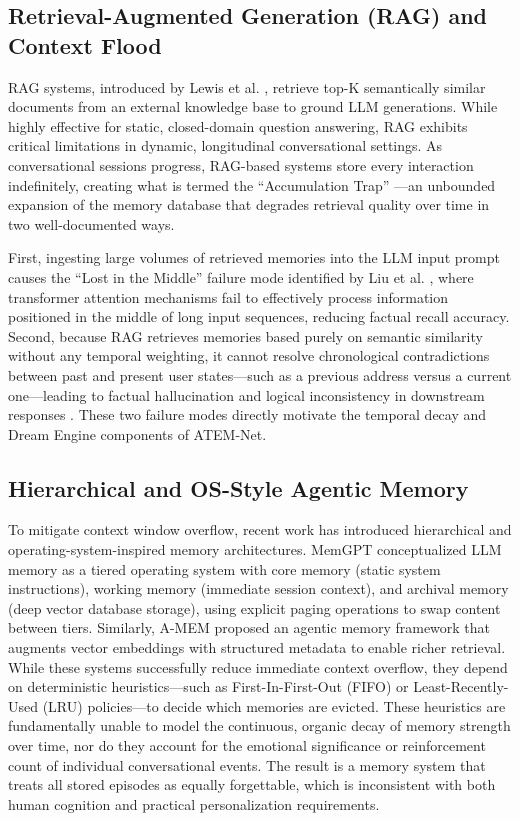 \documentclass[conference]{IEEEtran}
\begin{document}
\subsection{Retrieval-Augmented Generation (RAG) and Context Flood}

RAG systems, introduced by Lewis et al. \cite{lewis}, retrieve top-K semantically similar documents from an external knowledge base to ground LLM generations. While highly effective for static, closed-domain question answering, RAG exhibits critical limitations in dynamic, longitudinal conversational settings. As conversational sessions progress, RAG-based systems store every interaction indefinitely, creating what is termed the ``Accumulation Trap'' \cite{thompson}—an unbounded expansion of the memory database that degrades retrieval quality over time in two well-documented ways.

First, ingesting large volumes of retrieved memories into the LLM input prompt causes the ``Lost in the Middle'' failure mode identified by Liu et al. \cite{liu}, where transformer attention mechanisms fail to effectively process information positioned in the middle of long input sequences, reducing factual recall accuracy. Second, because RAG retrieves memories based purely on semantic similarity without any temporal weighting, it cannot resolve chronological contradictions between past and present user states—such as a previous address versus a current one—leading to factual hallucination and logical inconsistency in downstream responses \cite{sun}. These two failure modes directly motivate the temporal decay and Dream Engine components of ATEM-Net.

\subsection{Hierarchical and OS-Style Agentic Memory}

To mitigate context window overflow, recent work has introduced hierarchical and operating-system-inspired memory architectures. MemGPT \cite{packer} conceptualized LLM memory as a tiered operating system with core memory (static system instructions), working memory (immediate session context), and archival memory (deep vector database storage), using explicit paging operations to swap content between tiers. Similarly, A-MEM \cite{xu} proposed an agentic memory framework that augments vector embeddings with structured metadata to enable richer retrieval. While these systems successfully reduce immediate context overflow, they depend on deterministic heuristics—such as First-In-First-Out (FIFO) or Least-Recently-Used (LRU) policies—to decide which memories are evicted. These heuristics are fundamentally unable to model the continuous, organic decay of memory strength over time, nor do they account for the emotional significance or reinforcement count of individual conversational events. The result is a memory system that treats all stored episodes as equally forgettable, which is inconsistent with both human cognition and practical personalization requirements.
\end{document}
